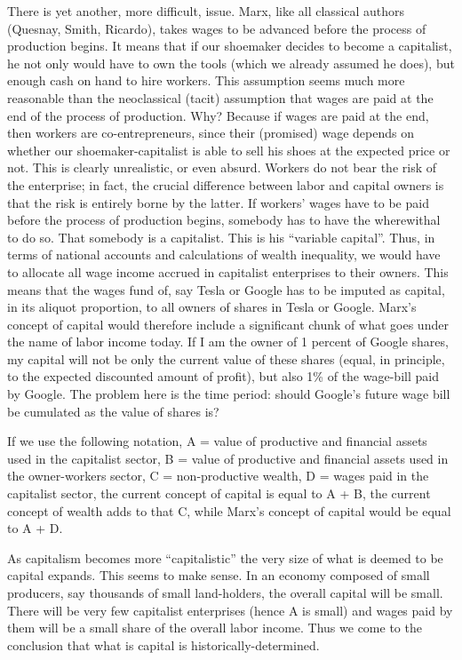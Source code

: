 \documentclass[
]{book}
\begin{document}
There is yet another, more difficult, issue. Marx, like all classical authors (Quesnay, Smith, Ricardo), takes wages to be advanced before the process of production begins. It means that if our shoemaker decides to become a capitalist, he not only would have to own the tools (which we already assumed he does), but enough cash on hand to hire workers. This assumption seems much more reasonable than the neoclassical (tacit) assumption that wages are paid at the end of the process of production. Why? Because if wages are paid at the end, then workers are co-entrepreneurs, since their (promised) wage depends on whether our shoemaker-capitalist is able to sell his shoes at the expected price or not. This is clearly unrealistic, or even absurd. Workers do not bear the risk of the enterprise; in fact, the crucial difference between labor and capital owners is that the risk is entirely borne by the latter. If workers' wages have to be paid before the process of production begins, somebody has to have the wherewithal to do so. That somebody is a capitalist. This is his ``variable capital''. Thus, in terms of national accounts and calculations of wealth inequality, we would have to allocate all wage income accrued in capitalist enterprises to their owners. This means that the wages fund of, say Tesla or Google has to be imputed as capital, in its aliquot proportion, to all owners of shares in Tesla or Google. Marx's concept of capital would therefore include a significant chunk of what goes under the name of labor income today. If I am the owner of 1 percent of Google shares, my capital will not be only the current value of these shares (equal, in principle, to the expected discounted amount of profit), but also 1\% of the wage-bill paid by Google. The problem here is the time period: should Google's future wage bill be cumulated as the value of shares is?

If we use the following notation, A = value of productive and financial assets used in the capitalist sector, B = value of productive and financial assets used in the owner-workers sector, C = non-productive wealth, D = wages paid in the capitalist sector, the current concept of capital is equal to A + B, the current concept of wealth adds to that C, while Marx's concept of capital would be equal to A + D.

As capitalism becomes more ``capitalistic'' the very size of what is deemed to be capital expands. This seems to make sense. In an economy composed of small producers, say thousands of small land-holders, the overall capital will be small. There will be very few capitalist enterprises (hence A is small) and wages paid by them will be a small share of the overall labor income. Thus we come to the conclusion that what is capital is historically-determined.
\end{document}
